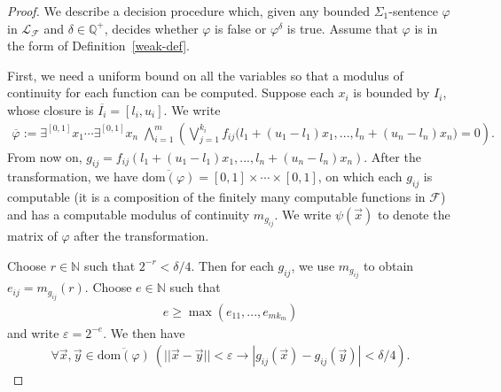 \documentclass[envcountsect]{llncs}
\newcommand{\dom}{\mathrm{dom}}
\begin{document}
\begin{proof}
We describe a decision procedure which, given any bounded $\Sigma_1$-sentence $\varphi$ in $\mathcal{L}_{\mathcal{F}}$ and $\delta\in \mathbb{Q}^+$, decides whether $\varphi$ is false or $\varphi^{\delta}$ is true. Assume that $\varphi$ is in the form of Definition~\ref{weak-def}. 

First, we need a uniform bound on all the variables so that a modulus of continuity for each function can be computed. Suppose each $x_i$ is bounded by $I_i$, whose closure is $\overline{I_i} = [l_i, u_i]$. We write %
\begin{eqnarray*}
\overline{\varphi} :=  \exists^{[0,1]} x_1 \cdots \exists^{[0,1]} x_n\; \bigwedge_{i=1}^m(\bigvee_{j=1}^{k_i} f_{ij}\big(l_1+(u_1-l_1)x_1,...,l_n+(u_n-l_n)x_n\big)=0).
\end{eqnarray*}
From now on, $g_{ij} = f_{ij}(l_1+(u_1-l_1)x_1,...,l_n+(u_n-l_n)x_n)$. After the transformation, we have $\overline{\dom(\varphi)} = [0,1]\times\cdots\times [0,1]$, on which each $g_{ij}$ is computable (it is a composition of the finitely many computable functions in $\mathcal{F}$) and has a computable modulus of continuity $m_{g_{ij}}$. We write $\psi(\vec x)$ to denote the matrix of $\varphi$ after the transformation. 

Choose $r\in \mathbb{N}$ such that $2^{-r}<\delta/4$. Then for each $g_{ij}$, we use $m_{g_{ij}}$ to obtain $e_{ij} = m_{g_{ij}}(r)$. Choose $e\in \mathbb{N}$ such that 
\begin{eqnarray}\label{e-def}
e\geq\max(e_{11},...,e_{mk_m})
\end{eqnarray} and write $\varepsilon = 2^{-e}$. We then have
\begin{eqnarray}\label{first}
\forall \vec x, \vec y\in \overline{\dom(\varphi)}\  (||\vec x-\vec y||<\varepsilon \rightarrow |g_{ij}(\vec x)-g_{ij}(\vec y)|<{\delta}/{4}).
\end{eqnarray}


\end{proof}
\end{document}
